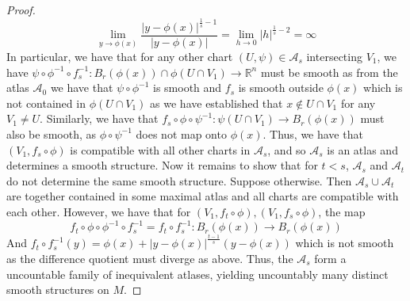 \documentclass{article}
\newcommand{\bb}[1]{\mathbb{#1}}
\begin{document}
\begin{proof}
    \[
      \lim_{y\to \phi(x)} \frac{|y - \phi(x)|^{\frac{1}{s}-1}}{|y - \phi(x)|} = \lim_{h\to 0}|h|^{\frac{1}{s}-2} = \infty
    \]
    In particular, we have that for any other chart $(U, \psi) \in \mathcal{A}_{s}$ intersecting $V_{1}$, we have $\psi \circ \phi^{-1} \circ f_{s}^{-1} : B_{r}(\phi(x)) \cap \phi(U\cap V_{1}) \to \bb{R}^{n}$ must be smooth as from the atlas $\mathcal{A}_{0}$ we have that $\psi \circ \phi^{-1}$ is smooth and $f_{s}$ is smooth outside $\phi(x)$ which is not contained in $\phi(U \cap V_{1})$ as we have established that $x \notin U \cap V_{1}$ for any $V_{1} \neq U$. Similarly, we have that $f_{s} \circ \phi \circ \psi^{-1} : \psi(U\cap V_{1}) \to B_{r}(\phi(x))$ must also be smooth, as $\phi \circ \psi^{-1}$ does not map onto $\phi(x)$. Thus, we have that $(V_{1}, f_{s}\circ \phi)$ is compatible with all other charts in $\mathcal{A}_{s}$, and so $\mathcal{A}_{s}$ is an atlas and determines a smooth structure. Now it remains to show that for $t < s$, $\mathcal{A}_{s}$ and $\mathcal{A}_{t}$ do not determine the same smooth structure. Suppose otherwise. Then $\mathcal{A}_{s} \cup \mathcal{A}_{t}$ are together contained in some maximal atlas and all charts are compatible with each other. However, we have that for $(V_{1}, f_{t}\circ \phi), (V_{1}, f_{s}\circ \phi)$, the map
    \[
      f_{t} \circ \phi \circ \phi^{-1} \circ f_{s}^{-1} = f_{t} \circ f_{s}^{-1}: B_{r}(\phi(x)) \to B_{r}(\phi(x))
    \]
    And $f_{t}\circ f_{s}^{-1} (y) = \phi(x) + |y-\phi(x)|^{\frac{t-1}{s}} (y - \phi(x))$ which is not smooth as the difference quotient must diverge as above. Thus, the $\mathcal{A}_{s}$ form a uncountable family of inequivalent atlases, yielding uncountably many distinct smooth structures on $M$.
\end{proof}
\end{document}
